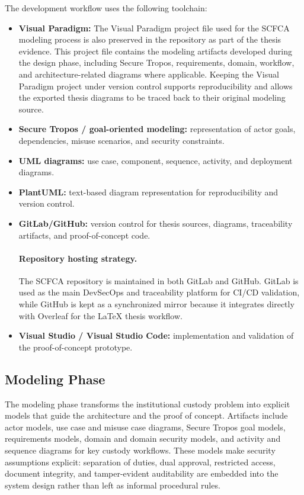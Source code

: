 \documentclass[12pt,a4paper]{report}
\begin{document}
The development workflow uses the following toolchain:

\begin{itemize}
    \item \textbf{Visual Paradigm:} The Visual Paradigm project file used for the SCFCA modeling process is also preserved in the repository as part of the thesis evidence. This project file contains the modeling artifacts developed during the design phase, including Secure Tropos, requirements, domain, workflow, and architecture-related diagrams where applicable. Keeping the Visual Paradigm project under version control supports reproducibility and allows the exported thesis diagrams to be traced back to their original modeling source. \cite{VisualParadigmProject} 
    \item \textbf{Secure Tropos / goal-oriented modeling:} representation of actor goals, dependencies, misuse scenarios, and security constraints.
    \item \textbf{UML diagrams:} use case, component, sequence, activity, and deployment diagrams.
    \item \textbf{PlantUML:} text-based diagram representation for reproducibility and version control.
    \item \textbf{GitLab/GitHub:} version control for thesis sources, diagrams, traceability artifacts, and proof-of-concept code.

\paragraph{Repository hosting strategy.}
The SCFCA repository is maintained in both GitLab and GitHub. GitLab is used as the main DevSecOps and traceability platform for CI/CD validation, while GitHub is kept as a synchronized mirror because it integrates directly with Overleaf for the LaTeX thesis workflow.

    \item \textbf{Visual Studio / Visual Studio Code:} implementation and validation of the proof-of-concept prototype.
\end{itemize}


\subsection{Modeling Phase}

The modeling phase transforms the institutional custody problem into explicit models that guide the architecture and the proof of concept. Artifacts include actor models, use case and misuse case diagrams, Secure Tropos goal models, requirements models, domain and domain security models, and activity and sequence diagrams for key custody workflows. These models make security assumptions explicit: separation of duties, dual approval, restricted access, document integrity, and tamper-evident auditability are embedded into the system design rather than left as informal procedural rules.
\end{document}
